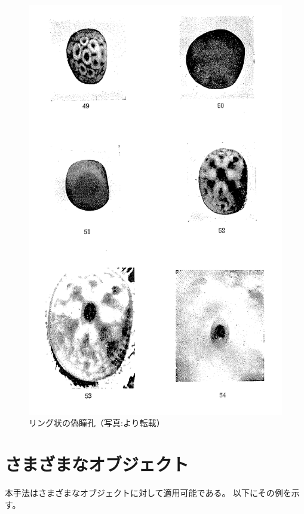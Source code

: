 \begin{figure}[htbp]
  \centering
  \includegraphics[width=4.5in]{./img/yagi1-ring-real.png}
  \caption{リング状の偽瞳孔（写真:\cite{yagi1951studies}より転載）}
  \label{FYagiRing}
\end{figure}


\newpage
\section{さまざまなオブジェクト}
\label{SVariousObject}

本手法はさまざまなオブジェクトに対して適用可能である。
以下にその例を示す。

